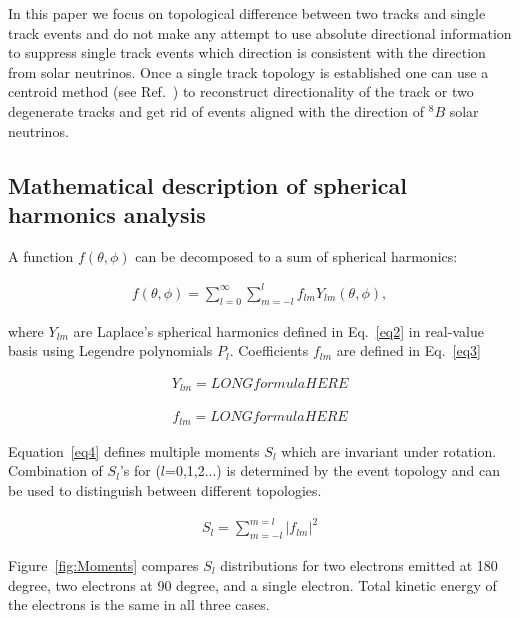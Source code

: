 \documentclass[12pt,twoside,letterpaper]{article}
\newcommand{\B}{^{8}B}
\begin{document}
In this paper we focus on topological difference between two tracks and single track events and do not make any attempt to use absolute directional information to suppress single track events  which direction is consistent with the direction from solar neutrinos. Once a single track topology is established one can use a centroid method (see Ref.~\cite{Directionality}) to reconstruct directionality of the track or two degenerate tracks and get rid of events aligned with the direction of $\B$ solar neutrinos.

\subsection{Mathematical description of spherical harmonics analysis}
A function $f(\theta,\phi)$ can be decomposed to a sum of spherical harmonics:

\begin{eqnarray}
\label{eq1}
f(\theta,\phi) = \sum_{l=0}^{\infty} \sum_{m=-l}^{l} f_{lm} Y_{lm}(\theta,\phi),
\end{eqnarray}

where $Y_{lm}$ are Laplace's spherical harmonics defined in Eq.~\ref{eq2} in real-value basis using Legendre polynomials $P_l$. Coefficients $f_{lm}$ are defined in Eq.~\ref{eq3} 

\begin{eqnarray}
\label{eq2}
Y_{lm} = LONGformulaHERE
\end{eqnarray}

\begin{eqnarray}
\label{eq3}
f_{lm} = LONGformulaHERE
\end{eqnarray}

Equation~\ref{eq4} defines multiple moments $S_l$ which are invariant under rotation. Combination of $S_l$'s for ($l$=0,1,2...) is determined by the event topology and can be used to distinguish between different topologies.

\begin{eqnarray}
\label{eq4}
S_l = \sum_{m=-l}^{m=l} |f_{lm}|^2
\end{eqnarray}

Figure~\ref{fig:Moments} compares $S_l$ distributions for two electrons emitted at 180 degree, two electrons at 90 degree, and a single electron. Total kinetic energy of the electrons is the same in all three cases.
\end{document}
